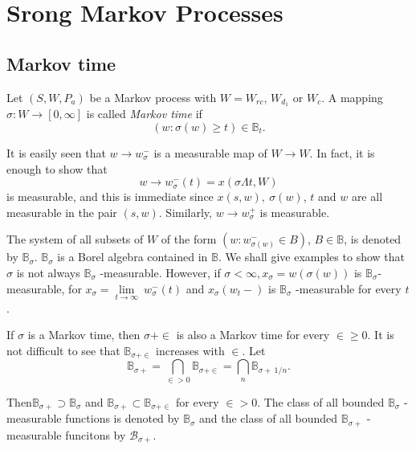  \chapter{Srong Markov Processes} %

\section{Markov time}\label{chap2-sec1}
\pageoriginale 

\begin{defi*}
Let $(S, W, P_a )$ be a Markov process with $ W = W_{rc}$,
  $W_{d_{1}}$ or $W_c$. A mapping $\sigma : W \to [ 0, \infty ]$ is
  called \textit{Markov time} if  
  $$
  (w : \sigma (w) \ge t ) \in \mathbb{B}_t.
  $$
\end{defi*}

It is easily seen that $w \to w^-_\sigma$ is a measurable map of $W
\to W$. In fact, it is enough to show that  
$$
w \to w^-_\sigma (t) = x ( \sigma \Lambda t, W )
$$
is measurable, and this is immediate  since $ x(s, w), ~ \sigma (w) $,
$t$ and $w$ are all measurable in the pair $(s, w)$. Similarly, $w \to
w^+_\sigma$ is measurable. 

The system of all subsets of $W$ of the form $( w : w^-_{\sigma (w)}
\in B )$, $B \in \mathbb{B}$, is denoted by
$\mathbb{B}_{\sigma}$. $\mathbb{B}_{\sigma}$ is a Borel algebra
contained in $\mathbb{B}$. We shall give examples to show that
$\sigma$ is not always $\mathbb{B}_{\sigma}$ -measurable. However, if
$\sigma < \infty, x_\sigma = w( \sigma (w))$ is  
$\mathbb{B}_{\sigma}$-measurable, for $x_\sigma = \lim \limits_{t \to
  \infty} ~ w^-_\sigma 
(t)$ and $x_\sigma (w_t-)$ is $\mathbb{B}_{\sigma}$ -measurable for
every $t$. 

If $\sigma$ is a Markov time, then $\sigma + \in$ is also a Markov
time for every $\in \ge 0$. It is not difficult to see that
$\mathbb{B}_{\sigma + \in}$ increases with $\in$. Let 
$$
\mathbb{B}_{\sigma +} = \bigcap_{\in > 0} \mathbb{B}_{\sigma + \in} =
\bigcap_{n} \mathbb{B}_{\sigma + ~ 1/n}. 
$$

Then\pageoriginale $\mathbb{B}_{\sigma + } \supset
\mathbb{B}_{\sigma}$ and $\mathbb{B}_{\sigma +} \subset
\mathbb{B}_{\sigma + \in}$ for every 
$\in > 0$. The class of all bounded $\mathbb{B}_{\sigma}$ -measurable
functions is denoted by $\mathbb{B}_\sigma$ and the class of all
bounded $\mathbb{B}_{\sigma +}$ -measurable funcitons by
$\mathscr{B}_{\sigma +}$. 

